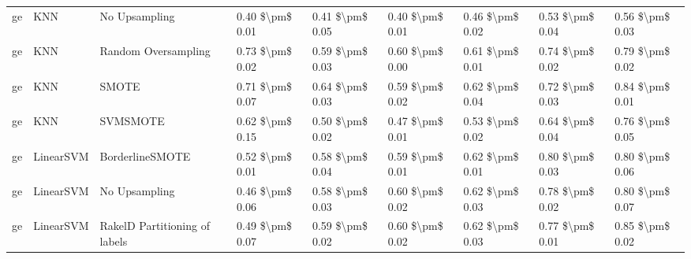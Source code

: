 \begin{tabular}{lllllllll}
      ge &                             KNN &                 No Upsampling &     0.40 \$\textbackslash pm\$ 0.01 &           0.41 \$\textbackslash pm\$ 0.05 &       0.40 \$\textbackslash pm\$ 0.01 &        0.46 \$\textbackslash pm\$ 0.02 &                         0.53 \$\textbackslash pm\$ 0.04 &     0.56 \$\textbackslash pm\$ 0.03 \\
      ge &                             KNN &           Random Oversampling &     0.73 \$\textbackslash pm\$ 0.02 &           0.59 \$\textbackslash pm\$ 0.03 &       0.60 \$\textbackslash pm\$ 0.00 &        0.61 \$\textbackslash pm\$ 0.01 &                         0.74 \$\textbackslash pm\$ 0.02 &     0.79 \$\textbackslash pm\$ 0.02 \\
      ge &                             KNN &                         SMOTE &     0.71 \$\textbackslash pm\$ 0.07 &           0.64 \$\textbackslash pm\$ 0.03 &       0.59 \$\textbackslash pm\$ 0.02 &        0.62 \$\textbackslash pm\$ 0.04 &                         0.72 \$\textbackslash pm\$ 0.03 &     0.84 \$\textbackslash pm\$ 0.01 \\
      ge &                             KNN &                      SVMSMOTE &     0.62 \$\textbackslash pm\$ 0.15 &           0.50 \$\textbackslash pm\$ 0.02 &       0.47 \$\textbackslash pm\$ 0.01 &        0.53 \$\textbackslash pm\$ 0.02 &                         0.64 \$\textbackslash pm\$ 0.04 &     0.76 \$\textbackslash pm\$ 0.05 \\
      ge &                       LinearSVM &               BorderlineSMOTE &     0.52 \$\textbackslash pm\$ 0.01 &           0.58 \$\textbackslash pm\$ 0.04 &       0.59 \$\textbackslash pm\$ 0.01 &        0.62 \$\textbackslash pm\$ 0.01 &                         0.80 \$\textbackslash pm\$ 0.03 &     0.80 \$\textbackslash pm\$ 0.06 \\
      ge &                       LinearSVM &                 No Upsampling &     0.46 \$\textbackslash pm\$ 0.06 &           0.58 \$\textbackslash pm\$ 0.03 &       0.60 \$\textbackslash pm\$ 0.02 &        0.62 \$\textbackslash pm\$ 0.03 &                         0.78 \$\textbackslash pm\$ 0.02 &     0.80 \$\textbackslash pm\$ 0.07 \\
      ge &                       LinearSVM & RakelD Partitioning of labels &     0.49 \$\textbackslash pm\$ 0.07 &           0.59 \$\textbackslash pm\$ 0.02 &       0.60 \$\textbackslash pm\$ 0.02 &        0.62 \$\textbackslash pm\$ 0.03 &                         0.77 \$\textbackslash pm\$ 0.01 &     0.85 \$\textbackslash pm\$ 0.02 \\

\end{tabular}
